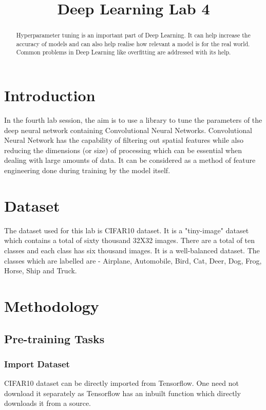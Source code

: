 \documentclass[conference, compsoc]{IEEEtran}
\begin{document}
\title{Deep Learning Lab 4}
\author{}

\maketitle
\begin{abstract}
    Hyperparameter tuning is an important part of Deep Learning. It can help increase the accuracy of models and can also help realise how relevant a model is for the real world. Common problems in Deep Learning like overfitting are addressed with its help.
\end{abstract}

\section{Introduction}
In the fourth lab session, the aim is to use a library to tune the parameters of the deep neural network containing Convolutional Neural Networks. Convolutional Neural Network has the capability of filtering out spatial features while also reducing the dimensions (or size) of processing which can be essential when dealing with large amounts of data. It can be considered as a method of feature engineering done during training by the model itself.

\section{Dataset}
The dataset used for this lab is CIFAR10 dataset. It is a "tiny-image" dataset which contains a total of sixty thousand 32X32 images. There are a total of ten classes and each class has six thousand images. It is a well-balanced dataset. The classes which are labelled are - Airplane, Automobile, Bird, Cat, Deer, Dog, Frog, Horse, Ship and Truck.

\section{Methodology}
\subsection{Pre-training Tasks}
\subsubsection{Import Dataset}
CIFAR10 dataset can be directly imported from Tensorflow. One need not download it separately as Tensorflow has an inbuilt function which directly downloads it from a source.
\end{document}
